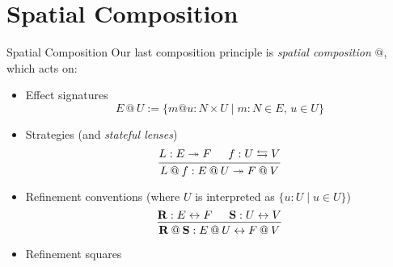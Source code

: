 \documentclass[aspectratio=1610,mathserif]{beamer}
\begin{document}
\section{Spatial Composition}

%
%

\begin{frame}{Spatial Composition}
  Our last composition principle is \emph{spatial composition} $\mathbin@$,
  which acts on:
  \pause
  \begin{itemize}
    \item Effect signatures
    \[
      E \mathbin@ U := \{ m @ u \mathbin: N \times U \mid
            m\mathbin:N \in E, \, u \in U \}
    \]

    \pause
    \item Strategies (and \emph{stateful lenses})
      \[
        \begin{prooftree}
          \hypo{L : E \twoheadrightarrow F}
          \hypo{f : U \leftrightarrows V}
          \infer2{L \mathbin@ f : E \mathbin@ U \twoheadrightarrow
                                  F \mathbin@ V}
        \end{prooftree}
      \]

    \pause
    \item Refinement conventions (where $U$ is interpreted as
         $\{ u : U \mid u \in U \}$)
      \[
        \begin{prooftree}
          \hypo{\mathbf{R} : E \leftrightarrow F}
          \hypo{\mathbf{S} : 
            U
            \leftrightarrow
            V}
          \infer2{\mathbf{R} \mathbin@ \mathbf{S} :
                    E \mathbin@ U \leftrightarrow
                                  F \mathbin@ V}
        \end{prooftree}
      \]

    \pause
    \item Refinement squares
  \end{itemize}
\end{frame}
\end{document}
